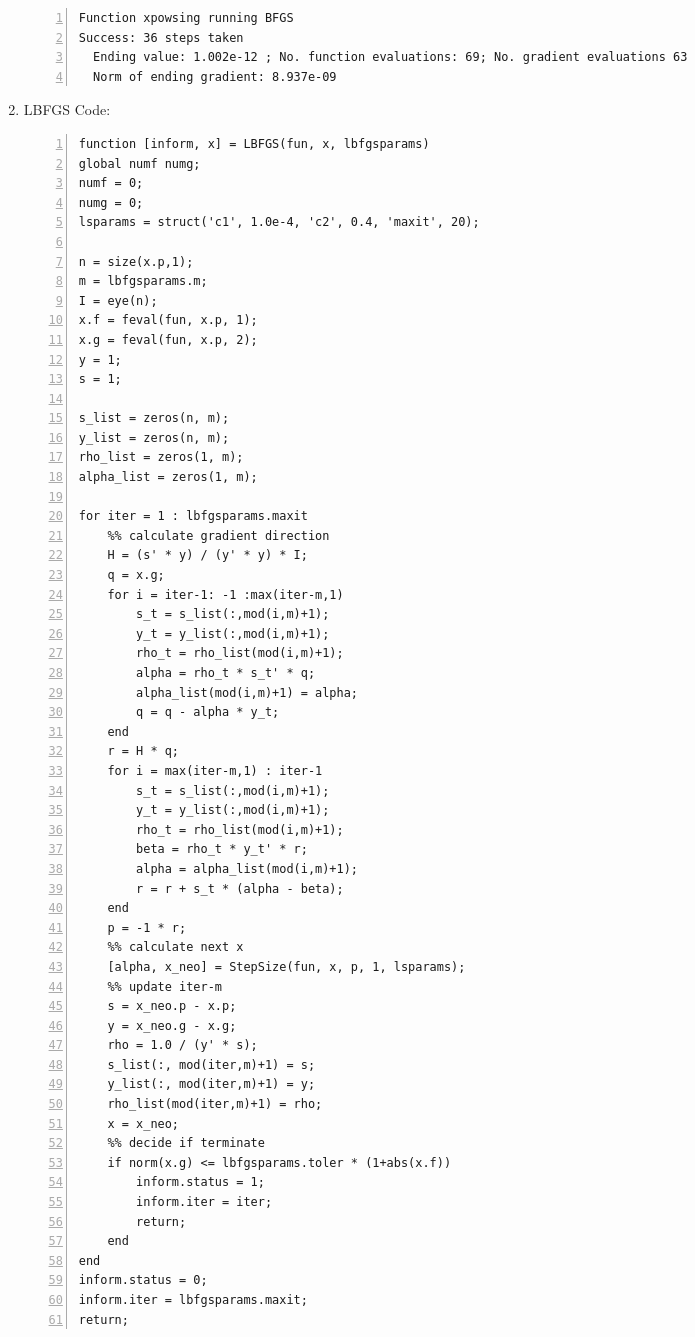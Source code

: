 \documentclass[12pt]{article}
\begin{document}
\begin{enumerate}
\begin{lstlisting}[language={[ANSI]C}, numbers=left, numberstyle=\tiny, frame=shadowbox, basicstyle=\ttfamily\small, showspaces=false, breaklines=true, showstringspaces=false, showtabs=false]
 Function xpowsing running BFGS
Success: 36 steps taken
  Ending value: 1.002e-12 ; No. function evaluations: 69; No. gradient evaluations 63
  Norm of ending gradient: 8.937e-09
\end{lstlisting}


\bigskip

\bigskip

\bigskip


\item

LBFGS Code:

\begin{lstlisting}[language={[ANSI]C}, numbers=left, numberstyle=\tiny, frame=shadowbox, basicstyle=\ttfamily\small, showspaces=false, breaklines=true, showstringspaces=false, showtabs=false]
 function [inform, x] = LBFGS(fun, x, lbfgsparams)
global numf numg;
numf = 0;
numg = 0;
lsparams = struct('c1', 1.0e-4, 'c2', 0.4, 'maxit', 20);

n = size(x.p,1);
m = lbfgsparams.m;
I = eye(n);
x.f = feval(fun, x.p, 1);
x.g = feval(fun, x.p, 2);
y = 1;
s = 1;

s_list = zeros(n, m);
y_list = zeros(n, m);
rho_list = zeros(1, m);
alpha_list = zeros(1, m);

for iter = 1 : lbfgsparams.maxit
    %% calculate gradient direction
    H = (s' * y) / (y' * y) * I;
    q = x.g;
    for i = iter-1: -1 :max(iter-m,1)
        s_t = s_list(:,mod(i,m)+1);
        y_t = y_list(:,mod(i,m)+1);
        rho_t = rho_list(mod(i,m)+1);
        alpha = rho_t * s_t' * q;
        alpha_list(mod(i,m)+1) = alpha;
        q = q - alpha * y_t;
    end
    r = H * q;
    for i = max(iter-m,1) : iter-1
        s_t = s_list(:,mod(i,m)+1);
        y_t = y_list(:,mod(i,m)+1);
        rho_t = rho_list(mod(i,m)+1);
        beta = rho_t * y_t' * r;
        alpha = alpha_list(mod(i,m)+1);
        r = r + s_t * (alpha - beta);
    end
    p = -1 * r;
    %% calculate next x
    [alpha, x_neo] = StepSize(fun, x, p, 1, lsparams);
    %% update iter-m
    s = x_neo.p - x.p;
    y = x_neo.g - x.g;
    rho = 1.0 / (y' * s);
    s_list(:, mod(iter,m)+1) = s;
    y_list(:, mod(iter,m)+1) = y;
    rho_list(mod(iter,m)+1) = rho;
    x = x_neo;
    %% decide if terminate
    if norm(x.g) <= lbfgsparams.toler * (1+abs(x.f))
        inform.status = 1;
        inform.iter = iter;
        return;
    end
end
inform.status = 0;
inform.iter = lbfgsparams.maxit;
return;
\end{lstlisting}

\bigskip


\end{enumerate}
\end{document}

